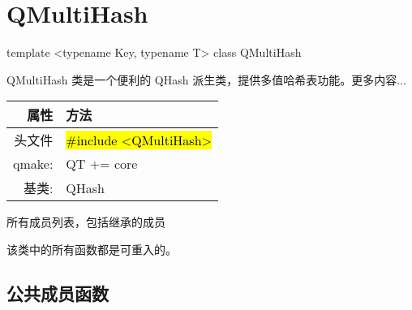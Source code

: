 \chapter{QMultiHash}

template <typename Key, typename T> class QMultiHash

QMultiHash 类是一个便利的 QHash 派生类，提供多值哈希表功能。更多内容...

\begin{tabular}{|r|l|}
	\hline
	属性 & 方法 \\
	\hline
    头文件  &	\hl{\#include <QMultiHash>} \\
    \hline
    qmake: & QT += core    \\
    \hline
    基类: & QHash    \\
	\hline
\end{tabular}

\begin{compactitem}
\item 所有成员列表，包括继承的成员
\end{compactitem}

\begin{notice}
该类中的所有函数都是可重入的。
\end{notice}


\section{公共成员函数}


